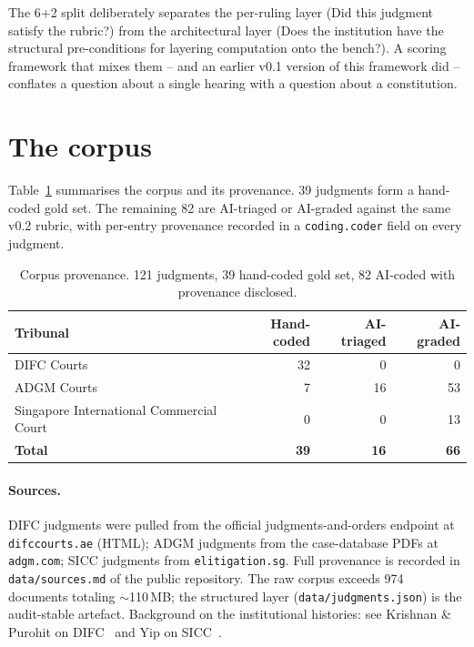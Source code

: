 \documentclass[11pt,letterpaper]{article}
\begin{document}
The 6+2 split deliberately separates the per-ruling layer (Did this judgment satisfy the rubric?) from the architectural layer (Does the institution have the structural pre-conditions for layering computation onto the bench?). A scoring framework that mixes them -- and an earlier v0.1 version of this framework did -- conflates a question about a single hearing with a question about a constitution.

\section{The corpus}

Table~\ref{tab:corpus} summarises the corpus and its provenance. 39 judgments form a hand-coded gold set. The remaining 82 are AI-triaged or AI-graded against the same v0.2 rubric, with per-entry provenance recorded in a \texttt{coding.coder} field on every judgment.

\begin{table}[h]
\centering
\caption{Corpus provenance. 121 judgments, 39 hand-coded gold set, 82 AI-coded with provenance disclosed.}
\label{tab:corpus}
\small
\begin{tabular}{l r r r}
\toprule
\textbf{Tribunal} & \textbf{Hand-coded} & \textbf{AI-triaged} & \textbf{AI-graded} \\
\midrule
DIFC Courts & 32 & 0 & 0 \\
ADGM Courts & 7 & 16 & 53 \\
Singapore International Commercial Court & 0 & 0 & 13 \\
\midrule
\textbf{Total} & \textbf{39} & \textbf{16} & \textbf{66} \\
\bottomrule
\end{tabular}
\end{table}

\paragraph{Sources.} DIFC judgments were pulled from the official judgments-and-orders endpoint at \texttt{difccourts.ae} (HTML); ADGM judgments from the case-database PDFs at \texttt{adgm.com}; SICC judgments from \texttt{elitigation.sg}. Full provenance is recorded in \texttt{data/sources.md} of the public repository. The raw corpus exceeds 974 documents totaling $\sim$110\,MB; the structured layer (\texttt{data/judgments.json}) is the audit-stable artefact. Background on the institutional histories: see Krishnan \& Purohit on DIFC~\cite{gulflitsurvey} and Yip on SICC~\cite{sicc-overview}.
\end{document}
